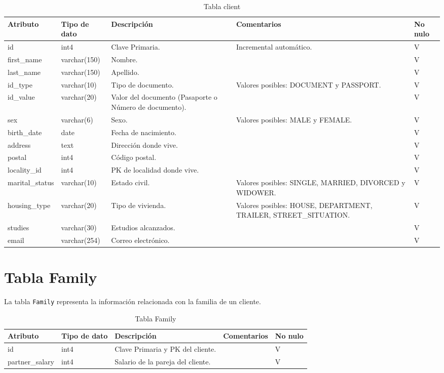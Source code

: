 \begin{table}[H]
\centering
\label{tab:client}
\begin{tabular}{|p{3cm}|p{2.5cm}|p{4.5cm}|p{4cm}|p{1cm}|}
\hline
\textbf{Atributo} & \textbf{Tipo de dato}  & \textbf{Descripción} & \textbf{Comentarios} & \textbf{No nulo} \\ \hline
id & int4 & Clave Primaria. & Incremental automático. & V \\ \hline
first\_name & varchar(150) & Nombre. &  & V \\ \hline
last\_name & varchar(150) & Apellido. &  & V \\ \hline
id\_type & varchar(10) & Tipo de documento. & Valores posibles: DOCUMENT y PASSPORT. & V \\ \hline
id\_value & varchar(20) & Valor del documento (Pasaporte o Número de documento). & & V \\ \hline
sex & varchar(6) & Sexo. & Valores posibles: MALE y FEMALE. & V \\ \hline
birth\_date & date & Fecha de nacimiento. & & V \\ \hline
address & text & Dirección donde vive. & & V \\ \hline
postal & int4 & Código postal. & & V \\ \hline
locality\_id & int4 & PK de localidad donde vive. & & V \\ \hline
marital\_status & varchar(10) & Estado civil. & Valores posibles: SINGLE, MARRIED, DIVORCED y WIDOWER. & V \\ \hline
housing\_type & varchar(20) & Tipo de vivienda. & Valores posibles: HOUSE, DEPARTMENT, TRAILER, STREET\_SITUATION. & V \\ \hline
studies & varchar(30) & Estudios alcanzados. & & V \\ \hline
email & varchar(254) & Correo electrónico. & & V \\ \hline
\end{tabular}
\caption{Tabla client}
\end{table}


\section{Tabla Family}\label{sec:table-family}
La tabla \texttt{Family} representa la información relacionada con la familia de un cliente.

\begin{table}[H]
\centering
\label{tab:family}
\begin{tabular}{|p{3cm}|p{2.5cm}|p{4.5cm}|p{4cm}|p{1cm}|}
\hline
\textbf{Atributo} & \textbf{Tipo de dato}  & \textbf{Descripción} & \textbf{Comentarios} & \textbf{No nulo} \\ \hline
id & int4 & Clave Primaria y PK del cliente. & & V \\ \hline
partner\_salary & int4 & Salario de la pareja del cliente. &  & V \\ \hline
\end{tabular}
\caption{Tabla Family}
\end{table}



